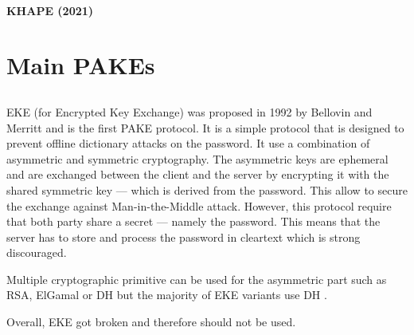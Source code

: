 \documentclass[../report.tex]{subfiles}
\begin{document}
\paragraph{KHAPE (2021)}





\section{Main PAKEs}


\subsection{}
\paragraph{}

EKE (for Encrypted Key Exchange) was proposed in 1992 by Bellovin and Merritt \cite{EKE_Paper} and is the first PAKE protocol. 
It is a simple protocol that is designed to prevent offline dictionary attacks on the password.
It use a combination of asymmetric and symmetric cryptography.
The asymmetric keys are ephemeral and are exchanged between the client and the server by encrypting it with the shared symmetric key --- which is derived from the password.
This allow to secure the exchange against Man-in-the-Middle attack. %
However, this protocol require that both party share a secret --- namely the password. This means that the server has to store and process the password in cleartext which is strong discouraged. %


Multiple cryptographic primitive can be used for the asymmetric part such as RSA, ElGamal or DH but the majority of EKE variants use DH \cite{17-2005}. %

Overall, EKE got broken and therefore should not be used. %


\paragraph{}
\end{document}
